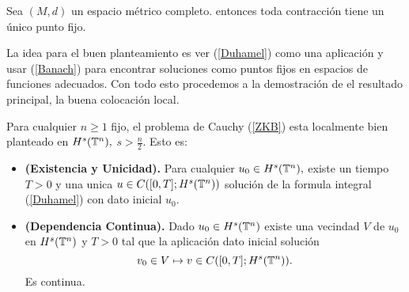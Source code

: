 \begin{theorem}\label{Banach}
Sea $(M,d)$ un espacio métrico completo. entonces toda contracción tiene un único punto fijo.   
\end{theorem}
La idea para el buen planteamiento es ver (\ref{Duhamel}) como una aplicación y usar (\ref{Banach}) para encontrar soluciones como puntos fijos en espacios de funciones adecuados. Con todo esto procedemos a la demostración de el resultado principal, la buena colocación local.
\begin{theorem}
    Para cualquier $n\geq 1$ fijo, el problema de Cauchy (\ref{ZKB}) esta localmente bien planteado en $H^s(\mathbb{T}^n),$ $s>\frac{n}{2}.$ Esto es:
    \begin{itemize}
        \item \textbf{(Existencia y Unicidad).} Para cualquier $u_0\in H^s(\mathbb{T}^n),$ existe un tiempo $T>0$ y una unica $u\in C([0,T];H^s(\mathbb{T}^n))$ solución de la formula integral (\ref{Duhamel}) con dato inicial $u_0.$
        \item \textbf{(Dependencia Continua).} Dado $u_0\in H^s(\mathbb{T}^n)$ existe una vecindad $V$ de $u_0$ en $H^s(\mathbb{T}^n)$ y $T>0$ tal que la aplicación dato inicial solución 
        $$v_0\in V\mapsto v\in C([0,T];H^s(\mathbb{T}^n)). $$ 
        Es continua. 
    \end{itemize}
\end{theorem}

